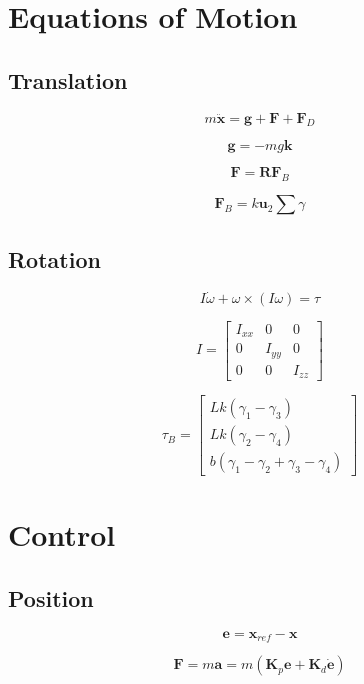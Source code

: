 \documentclass{article}
\begin{document}
\section{Equations of Motion}
\subsection{Translation}

\[
m \ddot{\mathbf{x}} = \mathbf{g} + \mathbf{F} + \mathbf{F}_D
\]

\[
\mathbf{g} = -mg \mathbf{k}
\]

\[
\mathbf{F} = \mathbf{R} \mathbf{F}_B
\]



\[
\mathbf{F}_B = k \mathbf{u}_2 \sum{\gamma}
\]

\subsection{Rotation}

\[
I \dot{\omega} + \omega \times \left( I \omega \right) = \tau
\]

\[
I =
\begin{bmatrix}
I_{xx} & 0 & 0 \\
0 & I_{yy} & 0 \\
0 & 0 & I_{zz}
\end{bmatrix}
\]

\[
\tau_B =
\begin{bmatrix}
Lk \left( \gamma_1 - \gamma_3 \right) \\
Lk \left( \gamma_2 - \gamma_4 \right) \\
b \left(  \gamma_1 - \gamma_2 + \gamma_3 - \gamma_4 \right)
\end{bmatrix}
\]

\section{Control}
\subsection{Position}

\[
\mathbf{e} = \mathbf{x}_{ref} - \mathbf{x}
\]

\[
\mathbf{F} =
m \mathbf{a} =
m \left( \mathbf{K}_p \mathbf{e} + \mathbf{K}_d \dot{\mathbf{e}} \right)
\]
\end{document}
